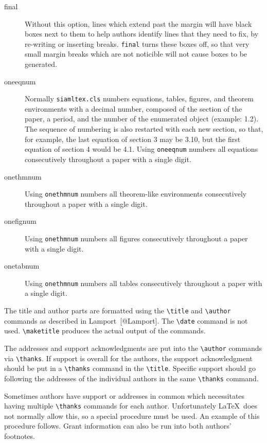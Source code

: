 \documentclass[]{article}
\begin{document}
\begin{description}
\item[final]
Without this option, lines which extend past the margin will have black
boxes next to them to help authors identify lines that they need to fix,
by re-writing or inserting breaks. \texttt{final} turns these boxes off,
so that very small margin breaks which are not noticible will not cause
boxes to be generated.
\item[oneeqnum]
Normally \texttt{siamltex.cls} numbers equations, tables, figures, and
theorem environments with a decimal number, composed of the section of
the paper, a period, and the number of the enumerated object (example:
1.2). The sequence of numbering is also restarted with each new section,
so that, for example, the last equation of section 3 may be 3.10, but
the first equation of section 4 would be 4.1. Using \texttt{oneeqnum}
numbers all equations consecutively throughout a paper with a single
digit.
\item[onethmnum]
Using \texttt{onethmnum} numbers all theorem-like environments
consecutively throughout a paper with a single digit.
\item[onefignum]
Using \texttt{onethmnum} numbers all figures consecutively throughout a
paper with a single digit.
\item[onetabnum]
Using \texttt{onethmnum} numbers all tables consecutively throughout a
paper with a single digit.
\end{description}

The title and author parts are formatted using the
\texttt{\textbackslash{}title} and \texttt{\textbackslash{}author}
commands as described in Lamport~{[}@Lamport{]}. The
\texttt{\textbackslash{}date} command is not used.
\texttt{\textbackslash{}maketitle} produces the actual output of the
commands.

The addresses and support acknowledgments are put into the
\texttt{\textbackslash{}author} commands via
\texttt{\textbackslash{}thanks}. If support is overall for the authors,
the support acknowledgment should be put in a
\texttt{\textbackslash{}thanks} command in the
\texttt{\textbackslash{}title}. Specific support should go following the
addresses of the individual authors in the same
\texttt{\textbackslash{}thanks} command.

Sometimes authors have support or addresses in common which necessitates
having multiple \texttt{\textbackslash{}thanks} commands for each
author. Unfortunately LaTeX~does not normally allow this, so a special
procedure must be used. An example of this procedure follows. Grant
information can also be run into both authors' footnotes.
\end{document}
